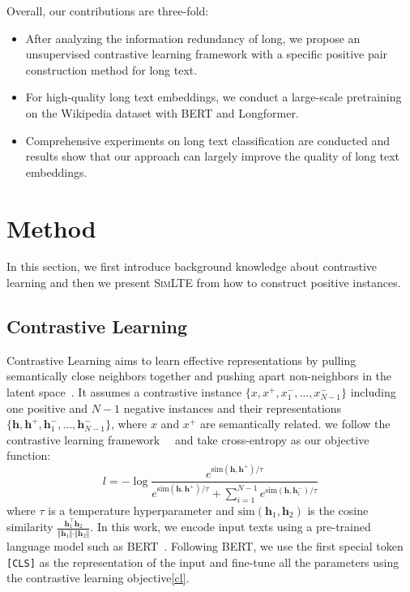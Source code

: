\documentclass[11pt]{article}
\begin{document}
Overall, our contributions are three-fold: 
\begin{itemize}[nosep,leftmargin=*]
    \item After analyzing the information redundancy of long, we propose an unsupervised contrastive learning framework with a specific positive pair construction method for long text.
    \item For high-quality long text embeddings, we conduct a large-scale pretraining on the Wikipedia dataset with BERT and Longformer.
    \item Comprehensive experiments on long text classification are conducted and results show that our approach can largely improve the quality of long text embeddings.
\end{itemize}

\section{Method}
In this section, we first introduce background knowledge about contrastive learning and then we present \textsc{SimLTE} from how to construct positive instances.
\subsection{Contrastive Learning}
Contrastive Learning aims to learn effective representations by pulling semantically close neighbors together and pushing apart non-neighbors in the latent space~\cite{Hadsell2006DimensionalityRB}.
It assumes a contrastive instance $\{x, x^{+}, x_1^{-},\dots,x_{N-1}^{-}\}$ including one positive and $N-1$ negative instances and their representations $\{\mathbf{h}, \mathbf{h}^{+}, \mathbf{h}_1^{-}, \dots,
\mathbf{h}_{N-1}^{-}\}$, where $x$ and $x^{+}$ are semantically related.
we follow the contrastive learning framework~~\cite{Chen2020ASF, Li2022UCTopicUC} and take cross-entropy as our objective function:
\begin{equation}
\label{cl}
    l = -\log \frac{e^{\mathrm{sim}(\mathbf{h}, \mathbf{h}^{+})/\tau}}{e^{\mathrm{sim}(\mathbf{h}, \mathbf{h}^{+})/\tau}+ \sum_{i=1}^{N-1}e^{\mathrm{sim}(\mathbf{h}, \mathbf{h}_i^{-})/\tau}}
\end{equation}
where $\tau$ is a temperature hyperparameter and $\mathrm{sim}(\mathbf{h}_1, \mathbf{h}_2)$ is the cosine similarity $\frac{\mathbf{h}_1^{\top}\mathbf{h}_2}{\Vert \mathbf{h}_1 \Vert \cdot \Vert \mathbf{h}_2 \Vert}$.
In this work, we encode input texts using a pre-trained language model such as BERT~\cite{Devlin2019BERTPO}. Following BERT, we use the first special token \texttt{[CLS]} as the representation of the input and fine-tune all the parameters using the contrastive learning objective\ref{cl}.
\end{document}
